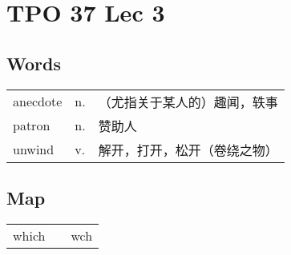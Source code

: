 \section{TPO 37 Lec 3}

\subsection{Words}

\begin{tabular}{lll}
    anecdote & n. & （尤指关于某人的）趣闻，轶事 \\
    patron   & n. & 赞助人            \\
    unwind   & v. & 解开，打开，松开（卷绕之物） \\
\end{tabular}

\subsection{Map}

\begin{tabular}{rc@{\quad$\to$\quad}l}
    which &  & wch \\
\end{tabular}
